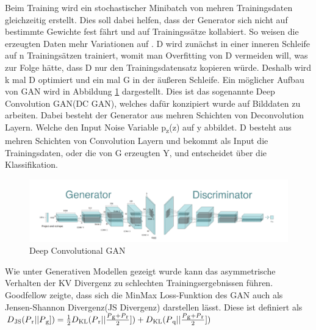 \documentclass{llncs}
\begin{document}
Beim Training wird ein stochastischer Minibatch von mehren Trainingsdaten gleichzeitig erstellt. Dies soll dabei helfen, dass der Generator sich nicht auf bestimmte Gewichte fest fährt und auf Trainingssätze kollabiert. So weisen die erzeugten Daten mehr Variationen auf \cite{improvingan}. D wird zunächst in einer inneren Schleife auf n Trainingsätzen trainiert, womit man Overfitting von D vermeiden will, was zur Folge hätte, dass D nur den Trainingsdatensatz kopieren würde. Deshalb wird k mal D optimiert und ein mal G in der äußeren Schleife. 
\newpage
Ein möglicher Aufbau von GAN wird in Abbildung \ref{fig:Bild6} dargestellt. Dies ist das sogenannte Deep Convolution GAN(DC GAN), welches dafür konzipiert wurde auf Bilddaten zu arbeiten. Dabei besteht der Generator aus mehren Schichten von Deconvolution Layern. Welche den Input Noise Variable p\textsubscript{z}(z) auf y abbildet. D besteht aus mehren Schichten von Convolution Layern und bekommt als Input die Trainingsdaten, oder die von G erzeugten Y, und entscheidet über die Klassifikation\cite{dcgan}.

\begin{figure}[htbp] 
	\centering
	\includegraphics[width=1.0\textwidth]{dcgan1.png}
	\caption{Deep Convolutional GAN}
	\label{fig:Bild6}
\end{figure}



Wie unter Generativen Modellen gezeigt wurde kann das asymmetrische Verhalten der KV Divergenz zu schlechten Trainingsergebnissen führen. Goodfellow \cite{goodfellow2014} zeigte, dass sich die MinMax Loss-Funktion des GAN auch als Jensen-Shannon Divergenz(JS Divergenz) darstellen lässt. Diese ist definiert als\\

\begin{math} D\textsubscript{JS}(P\textsubscript{r}|| P\textsubscript{g}])=\frac{1}{2}D\textsubscript{KL}(P\textsubscript{r}|| \frac{P\textsubscript{g}+P\textsubscript{r}}{2}])+D\textsubscript{KL}(P\textsubscript{q}|| \frac{P\textsubscript{g}+P\textsubscript{r}}{2}])  
\end{math}
\\
\end{document}
